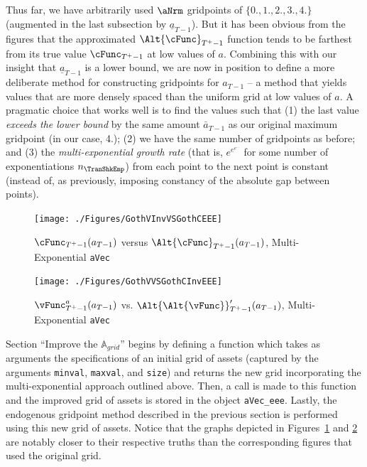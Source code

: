 \documentclass[titlepage, headings=optiontotocandhead]{\econtex}
\begin{document}
Thus far, we have arbitrarily used $\aNrm$ gridpoints of
$\{0.,1.,2.,3.,4.\}$ (augmented in the last subsection by
$\underline{a}_{T-1}$).  But it has been obvious from the figures that
the approximated $\Alt{\cFunc}_{T^{+}-1}$ function tends to be farthest from its true
value $\cFunc_{T^{+}-1}$ at low values of ${a}$.  Combining this with our insight that
$\underline{a}_{T-1}$ is a lower bound, we are now in position to
define a more deliberate method for constructing gridpoints for
${a}_{T-1}$ -- a method that yields values that are more densely
spaced than the uniform grid at low values of ${a}$.  A pragmatic
choice that works well is to find the values such that (1) the last
value \textit{exceeds the lower bound} by the same amount $\bar{a}_{T-1}$
as our original maximum gridpoint (in our case, 4.); (2) we have the
same number of gridpoints as before; and (3) the \textit{multi-exponential growth rate} (that is, $e^{e^{e^{...}}}$ for some
number of exponentiations $n_{\TranShkEmp}$) from each point to the next point is
constant (instead of, as previously, imposing constancy of the
absolute gap between points).

\hypertarget{GothVInvVSGothCEEE}{}
\begin{figure}
  \centerline{\texttt{[image: ./Figures/GothVInvVSGothCEEE]}}
  \caption{$\cFunc_{T^{+}-1}({a}_{T-1})$ versus
    $\Alt{\cFunc}_{T^{+}-1}({a}_{T-1})$, Multi-Exponential \texttt{aVec}}
  \label{fig:GothVInvVSGothCEE}
\end{figure}


\hypertarget{GothVVSGothCInvEEE}{}
\begin{figure}
  \texttt{[image: ./Figures/GothVVSGothCInvEEE]}
  \caption{$\vFunc^{{a}}_{T^{+}-1}({a}_{T-1})$ vs.
    $\Alt{\Alt{\vFunc}}_{T^{+}-1}^{\prime}({a}_{T-1})$, Multi-Exponential \texttt{aVec}}
  \label{fig:GothVVSGothCInvEE}
\end{figure}

Section ``Improve the $\mathbb{A}_{grid}$'' begins by defining a function which takes as arguments the specifications of an initial grid of assets
(captured by the arguments \texttt{minval}, \texttt{maxval}, and \texttt{size}) and returns the new grid incorporating the
multi-exponential approach outlined above. Then, a call is made to this function and the improved
grid of assets is stored in the object \texttt{aVec\_eee}. Lastly, the endogenous gridpoint method described in the previous
section is performed using this new grid of assets.
Notice that the graphs depicted in Figures~\ref{fig:GothVInvVSGothCEE} and
\ref{fig:GothVVSGothCInvEE} are notably closer to their
respective truths than the corresponding figures that used the original
grid.
\end{document}
